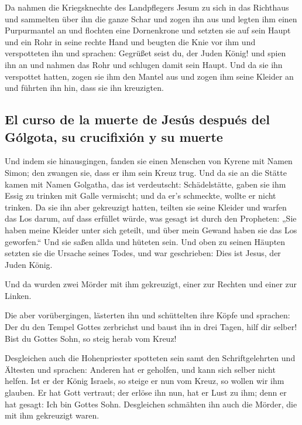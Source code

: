  Da nahmen die Kriegsknechte des Landpflegers Jesum zu
sich in das Richthaus und sammelten über ihn die ganze Schar
 und zogen ihn aus und legten ihm einen Purpurmantel an
 und flochten eine Dornenkrone und setzten sie auf sein
Haupt und ein Rohr in seine rechte Hand und beugten die Knie vor ihm und
verspotteten ihn und sprachen: Gegrüßet seist du, der Juden König!
 und spien ihn an und nahmen das Rohr und schlugen damit
sein Haupt.  Und da sie ihn verspottet hatten, zogen sie
ihm den Mantel aus und zogen ihm seine Kleider an und führten ihn hin,
dass sie ihn kreuzigten.

\hypertarget{el-curso-de-la-muerte-de-jesuxfas-despuuxe9s-del-guxf3lgota-su-crucifixiuxf3n-y-su-muerte}{%
\subsection{El curso de la muerte de Jesús después del Gólgota, su
crucifixión y su
muerte}\label{el-curso-de-la-muerte-de-jesuxfas-despuuxe9s-del-guxf3lgota-su-crucifixiuxf3n-y-su-muerte}}

 Und indem sie hinausgingen, fanden sie einen Menschen
von Kyrene mit Namen Simon; den zwangen sie, dass er ihm sein Kreuz
trug.  Und da sie an die Stätte kamen mit Namen Golgatha,
das ist verdeutscht: Schädelstätte,  gaben sie ihm Essig
zu trinken mit Galle vermischt; und da er's schmeckte, wollte er nicht
trinken.  Da sie ihn aber gekreuzigt hatten, teilten sie
seine Kleider und warfen das Los darum, auf dass erfüllet würde, was
gesagt ist durch den Propheten: „Sie haben meine Kleider unter sich
geteilt, und über mein Gewand haben sie das Los geworfen.``
 Und sie saßen allda und hüteten sein. 
Und oben zu seinen Häupten setzten sie die Ursache seines Todes, und war
geschrieben: Dies ist Jesus, der Juden König.

 Und da wurden zwei Mörder mit ihm gekreuzigt, einer zur
Rechten und einer zur Linken.

 Die aber vorübergingen, lästerten ihn und schüttelten
ihre Köpfe  und sprachen: Der du den Tempel Gottes
zerbrichst und baust ihn in drei Tagen, hilf dir selber! Bist du Gottes
Sohn, so steig herab vom Kreuz!

 Desgleichen auch die Hohenpriester spotteten sein samt
den Schriftgelehrten und Ältesten und sprachen:  Anderen
hat er geholfen, und kann sich selber nicht helfen. Ist er der König
Israels, so steige er nun vom Kreuz, so wollen wir ihm glauben.
 Er hat Gott vertraut; der erlöse ihn nun, hat er Lust zu
ihm; denn er hat gesagt: Ich bin Gottes Sohn. 
Desgleichen schmähten ihn auch die Mörder, die mit ihm gekreuzigt waren.

